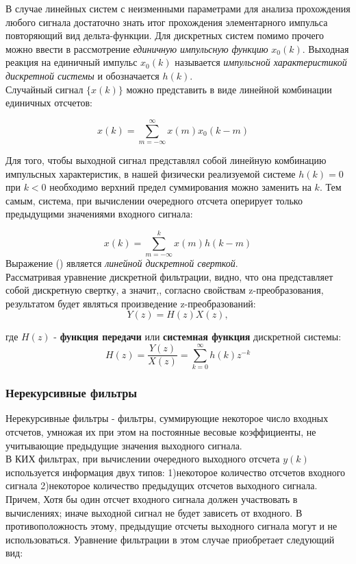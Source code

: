 \documentclass[a4paper,14pt]{article}
\begin{document}
В случае линейных систем с неизменными параметрами для анализа
прохождения любого сигнала достаточно знать итог прохождения элементарного импульса повторяющий вид дельта-функции. Для дискретных систем помимо прочего можно ввести в рассмотрение \textit{единичную импульсную функцию} $x_0(k)$.  Выходная реакция на единичный импульс $x_0(k)$ называется \textit{импульсной
характеристикой дискретной системы} и обозначается $h(k)$.\\

Случайный сигнал $\{x(k)\}$ можно представить в виде линейной комбинации единичных отсчетов:

\[
	x(k) = \sum_{m=-\infty}^\infty x(m) x_0 (k-m) \quad
\]

Для того, чтобы выходной сигнал представлял собой линейную комбинацию импульсных характеристик, в нашей физически реализуемой системе $h(k) = 0$ при $k < 0$ необходимо  верхний предел суммирования можно заменить на $k$. 
Тем самым, система, при вычислении очередного отсчета оперирует только предыдущими значениями входного сигнала:


\begin{equation}
	x(k) = \sum_{m=-\infty}^k x(m) h (k-m) 
\end{equation}
Выражение (\theequation) является \textit{линейной дискретной сверткой}.\\

Рассматривая уравнение дискретной фильтрации, видно, что она представляет собой дискретную свертку, а значит,, согласно свойствам z-преобразования, результатом будет являться произведение z-преобразований:
\begin{equation}
	Y(z) = H(z)X(z),
\end{equation}

где $H(z)$ - \textbf{функция передачи} или \textbf{системная функция} дискретной системы:
\begin{equation}
	H(z) = \frac{Y(z)}{X(z)} = \sum_{k=0}^\infty h(k) z^{-k}
\end{equation}

\subsubsection{Нерекурсивные фильтры}
Нерекурсивные фильтры - фильтры, суммирующие некоторое число входных отсчетов, умножая их при этом на постоянные весовые коэффициенты, не учитывающие предыдущие значения выходного сигнала.\\

В КИХ фильтрах, при вычислении очередного выходного отсчета $y(k)$ используется информация двух типов: 
1)некоторое количество отсчетов входного сигнала 
2)некоторое количество предыдущих отсчетов выходного сигнала. 
Причем, Хотя бы один отсчет входного сигнала должен участвовать в вычислениях; 
иначе выходной сигнал не будет зависеть от входного. В противоположность этому, предыдущие отсчеты выходного сигнала могут и не использоваться. Уравнение фильтрации в этом случае приобретает следующий вид:
\end{document}
